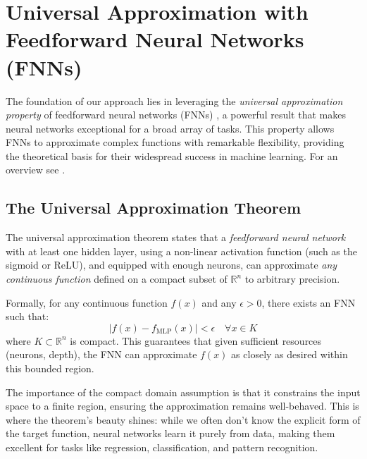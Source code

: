 \documentclass{article}
\theoremstyle{definition}
\theoremstyle{remark}
\newcounter{ct}
\begin{document}
\newpage





\newpage
\appendix 

\section{Universal Approximation with Feedforward Neural Networks (FNNs)}\label{sec:uniapproxffn}

The foundation of our approach lies in leveraging the \textit{universal approximation property} of feedforward neural networks (FNNs) \citep{poggio1990networks}, a powerful result that makes neural networks exceptional for a broad array of tasks. This property allows FNNs to approximate complex functions with remarkable flexibility, providing the theoretical basis for their widespread success in machine learning.
For an overview see \citep{blum1991approximation,scarselli1998universal,augustine2024survey}.





\subsection{The Universal Approximation Theorem}
The universal approximation theorem states that a \textit{feedforward neural network} with at least one hidden layer, using a non-linear activation function (such as the sigmoid or ReLU), and equipped with enough neurons, can approximate \textit{any continuous function} defined on a compact subset of \(\mathbb{R}^n\) to arbitrary precision.

Formally, for any continuous function \(f(x)\) and any \(\epsilon > 0\), there exists an FNN such that:
\[
| f(x) - f_{\text{MLP}}(x) | < \epsilon \quad \forall x \in K
\]
where \(K \subset \mathbb{R}^n\) is compact. This guarantees that given sufficient resources (neurons, depth), the FNN can approximate \(f(x)\) as closely as desired within this bounded region.

The importance of the compact domain assumption is that it constrains the input space to a finite region, ensuring the approximation remains well-behaved.	
This is where the theorem’s beauty shines: while we often don’t know the explicit form of the target function, neural networks learn it purely from data, making them excellent for tasks like regression, classification, and pattern recognition.
\end{document}
